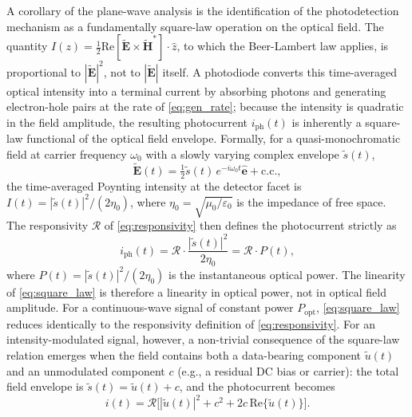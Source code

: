 A corollary of the plane-wave analysis is the identification of the photodetection mechanism as a fundamentally square-law operation on the optical field. The quantity $I(z) = \tfrac{1}{2}\mathrm{Re}[\tilde{\mathbf{E}} \times \tilde{\mathbf{H}}^*]\cdot\hat{z}$, to which the Beer-Lambert law applies, is proportional to $|\tilde{\mathbf{E}}|^2$, not to $|\tilde{\mathbf{E}}|$ itself. A photodiode converts this time-averaged optical intensity into a terminal current by absorbing photons and generating electron-hole pairs at the rate of \cref{eq:gen_rate}; because the intensity is quadratic in the field amplitude, the resulting photocurrent $i_\mathrm{ph}(t)$ is inherently a square-law functional of the optical field envelope. Formally, for a quasi-monochromatic field at carrier frequency $\omega_0$ with a slowly varying complex envelope $\tilde{s}(t)$,
\begin{equation}
    \tilde{\mathbf{E}}(t) = \tfrac{1}{2}\tilde{s}(t)\,e^{-i\omega_0 t}\hat{\mathbf{e}} + \mathrm{c.c.},
    \label{eq:envelope_field}
\end{equation}
the time-averaged Poynting intensity at the detector facet is $I(t) = |\tilde{s}(t)|^2/(2\eta_0)$, where $\eta_0 = \sqrt{\mu_0/\varepsilon_0}$ is the impedance of free space. The responsivity $\mathcal{R}$ of \cref{eq:responsivity} then defines the photocurrent strictly as
\begin{equation}
    i_\mathrm{ph}(t) = \mathcal{R}\cdot\frac{|\tilde{s}(t)|^2}{2\eta_0} = \mathcal{R}\cdot P(t),
    \label{eq:square_law}
\end{equation}
where $P(t) = |\tilde{s}(t)|^2/(2\eta_0)$ is the instantaneous optical power. The linearity of \cref{eq:square_law} is therefore a linearity in optical power, not in optical field amplitude. For a continuous-wave signal of constant power $P_\mathrm{opt}$, \cref{eq:square_law} reduces identically to the responsivity definition of \cref{eq:responsivity}. For an intensity-modulated signal, however, a non-trivial consequence of the square-law relation emerges when the field contains both a data-bearing component $\tilde{u}(t)$ and an unmodulated component $c$ (e.g., a residual DC bias or carrier): the total field envelope is $\tilde{s}(t) = \tilde{u}(t) + c$, and the photocurrent becomes
\begin{equation}
    i(t) = \mathcal{R}\bigl[|\tilde{u}(t)|^2 + c^2 + 2c\,\mathrm{Re}\{\tilde{u}(t)\}\bigr].
    \label{eq:square_law_expand}
\end{equation}
